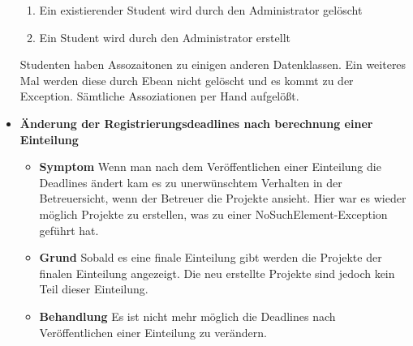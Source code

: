 \documentclass[parskip=full]{scrartcl}
\newcommand{\fehler}[4]{\textbf{#1}
 							\begin{itemize}
 							  \item \textbf{Symptom}  #2
 							  \item \textbf{Grund} #3
 							  \item \textbf{Behandlung} #4
 							\end{itemize}}
\begin{document}
\begin{itemize}
{\begin{enumerate}
  \item Ein existierender Student wird durch den Administrator gelöscht
  \item Ein Student wird durch den Administrator erstellt
\end{enumerate}}{Studenten haben Assozaitonen zu einigen anderen
Datenklassen. Ein weiteres Mal werden diese durch Ebean nicht gelöscht und es
kommt zu der Exception. }{Sämtliche Assoziationen per Hand aufgelößt.}
\item \fehler{Änderung der Registrierungsdeadlines nach
berechnung einer Einteilung}{Wenn man nach dem Veröffentlichen einer Einteilung
die Deadlines ändert kam es zu unerwünschtem Verhalten in der Betreuersicht, wenn der Betreuer die Projekte ansieht. Hier war es wieder möglich Projekte zu erstellen, was zu
einer NoSuchElement-Exception geführt hat. 
}{Sobald es eine finale Einteilung gibt werden die Projekte der finalen
Einteilung angezeigt. Die neu erstellte Projekte sind jedoch kein Teil dieser
Einteilung.}{Es ist nicht mehr möglich die Deadlines nach Veröffentlichen einer
Einteilung zu verändern.}
\end{itemize}
\end{document}
